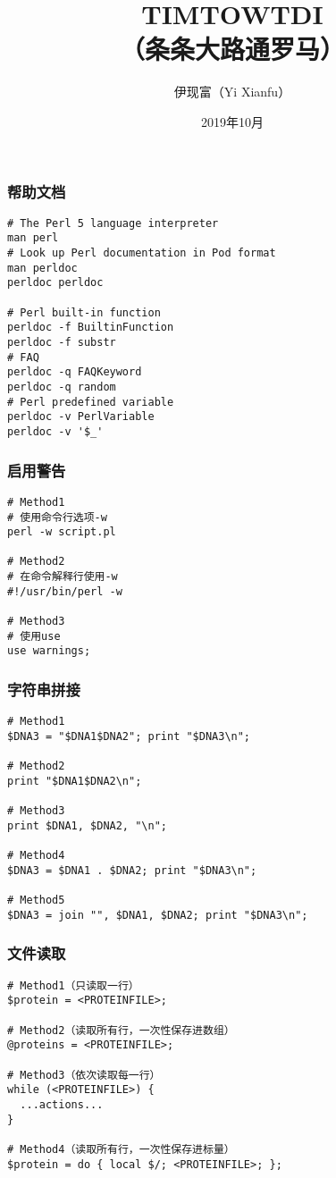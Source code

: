 


\title[TIMTOWTDI]{TIMTOWTDI\\（条条大路通罗马）}
\author[Yixf]{伊现富（Yi Xianfu）}
\date{2019年10月}

%
\begin{frame}
  \titlepage
\end{frame}

\begin{frame}[fragile]
  \frametitle{帮助文档}
\begin{lstlisting}
# The Perl 5 language interpreter
man perl
# Look up Perl documentation in Pod format
man perldoc
perldoc perldoc

# Perl built-in function
perldoc -f BuiltinFunction
perldoc -f substr
# FAQ
perldoc -q FAQKeyword
perldoc -q random
# Perl predefined variable
perldoc -v PerlVariable
perldoc -v '$_'
\end{lstlisting}
\end{frame}

\begin{frame}[fragile]
  \frametitle{启用警告}
\begin{lstlisting}
# Method1
# 使用命令行选项-w
perl -w script.pl

# Method2
# 在命令解释行使用-w
#!/usr/bin/perl -w

# Method3
# 使用use
use warnings;
\end{lstlisting}
\end{frame}

\begin{frame}[fragile]
  \frametitle{字符串拼接}
\begin{lstlisting}
# Method1
$DNA3 = "$DNA1$DNA2"; print "$DNA3\n";

# Method2
print "$DNA1$DNA2\n";

# Method3
print $DNA1, $DNA2, "\n";

# Method4
$DNA3 = $DNA1 . $DNA2; print "$DNA3\n";

# Method5
$DNA3 = join "", $DNA1, $DNA2; print "$DNA3\n";
\end{lstlisting}
\end{frame}

\begin{frame}[fragile]
  \frametitle{文件读取}
\begin{lstlisting}
# Method1（只读取一行）
$protein = <PROTEINFILE>;

# Method2（读取所有行，一次性保存进数组）
@proteins = <PROTEINFILE>;

# Method3（依次读取每一行）
while (<PROTEINFILE>) {
  ...actions...
}

# Method4（读取所有行，一次性保存进标量）
$protein = do { local $/; <PROTEINFILE>; };
\end{lstlisting}
\end{frame}

